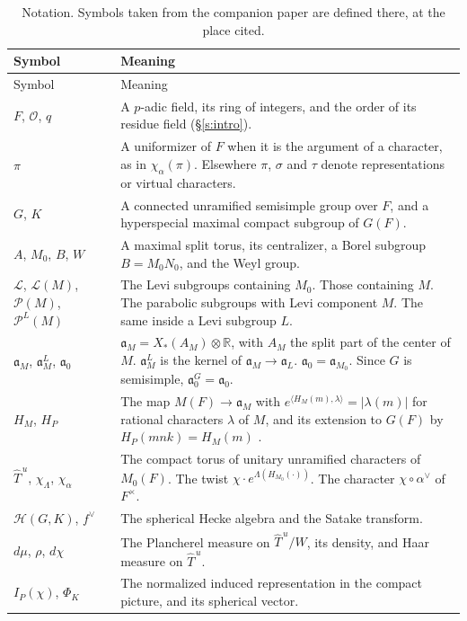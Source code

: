 \documentclass[12pt,letterpaper]{article}
\numberwithin{equation}{section}
\theoremstyle{plain}
\theoremstyle{definition}
\theoremstyle{remark}
\newcommand{\OO}{\mathcal{O}}
\newcommand{\Hc}{\mathcal{H}}
\newcommand{\cP}{\mathcal{P}}
\newcommand{\cL}{\mathcal{L}}
\newcommand{\fa}{\mathfrak{a}}
\newcommand{\ip}[1]{\langle #1\rangle}
\newcommand{\Thu}{\widehat{T}^{\,u}}
\begin{document}
{\small
\begin{longtable}{@{}>{\raggedright\arraybackslash}p{}>{\raggedright\arraybackslash}p{}@{}}
\caption{Notation. Symbols taken from the companion paper are defined there, at the place cited.}\label{tab:notation}\\
\toprule
Symbol & Meaning\\
\midrule
\endfirsthead
\toprule
Symbol & Meaning\\
\midrule
\endhead
\bottomrule
\endfoot
$F$, $\OO$, $q$ & A $p$-adic field, its ring of integers, and the order of its residue field (\S\ref{s:intro}).\\
$\pi$ & A uniformizer of $F$ when it is the argument of a character, as in $\chi_\alpha(\pi)$. Elsewhere $\pi$, $\sigma$ and $\tau$ denote representations or virtual characters.\\
$G$, $K$ & A connected unramified semisimple group over $F$, and a hyperspecial maximal compact subgroup of $G(F)$.\\
$A$, $M_0$, $B$, $W$ & A maximal split torus, its centralizer, a Borel subgroup $B=M_0N_0$, and the Weyl group.\\
$\cL$, $\cL(M)$, $\cP(M)$, $\cP^L(M)$ & The Levi subgroups containing $M_0$. Those containing $M$. The parabolic subgroups with Levi component $M$. The same inside a Levi subgroup $L$.\\
$\fa_M$, $\fa_M^L$, $\fa_0$ & $\fa_M=X_*(A_M)\otimes\mathbb{R}$, with $A_M$ the split part of the center of $M$. $\fa_M^L$ is the kernel of $\fa_M\to\fa_L$. $\fa_0=\fa_{M_0}$. Since $G$ is semisimple, $\fa_0^G=\fa_0$.\\
$H_M$, $H_P$ & The map $M(F)\to\fa_M$ with $e^{\ip{H_M(m),\lambda}}=|\lambda(m)|$ for rational characters $\lambda$ of $M$, and its extension to $G(F)$ by $H_P(mnk)=H_M(m)$ \cite[Glossary]{JC26}.\\
$\Thu$, $\chi_\Lambda$, $\chi_\alpha$ & The compact torus of unitary unramified characters of $M_0(F)$. The twist $\chi\cdot e^{\Lambda(H_{M_0}(\cdot))}$. The character $\chi\circ\alpha^\vee$ of $F^\times$.\\
$\Hc(G,K)$, $f^\vee$ & The spherical Hecke algebra and the Satake transform.\\
$d\mu$, $\rho$, $d\chi$ & The Plancherel measure on $\Thu/W$, its density, and Haar measure on $\Thu$.\\
$I_P(\chi)$, $\Phi_K$ & The normalized induced representation in the compact picture, and its spherical vector.\\

\end{longtable}}
\end{document}
